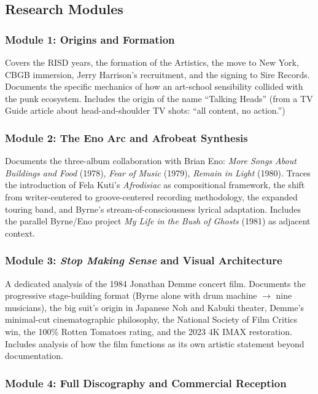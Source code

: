 \documentclass[11pt,letterpaper]{article}
\begin{document}
\subsection{Research Modules}

\subsubsection{Module 1: Origins and Formation}

Covers the RISD years, the formation of the Artistics, the move to New York, CBGB immersion, Jerry Harrison's recruitment, and the signing to Sire Records. Documents the specific mechanics of how an art-school sensibility collided with the punk ecosystem. Includes the origin of the name ``Talking Heads'' (from a TV Guide article about head-and-shoulder TV shots: ``all content, no action.'')

\subsubsection{Module 2: The Eno Arc and Afrobeat Synthesis}

Documents the three-album collaboration with Brian Eno: \textit{More Songs About Buildings and Food} (1978), \textit{Fear of Music} (1979), \textit{Remain in Light} (1980). Traces the introduction of Fela Kuti's \textit{Afrodisiac} as compositional framework, the shift from writer-centered to groove-centered recording methodology, the expanded touring band, and Byrne's stream-of-consciousness lyrical adaptation. Includes the parallel Byrne/Eno project \textit{My Life in the Bush of Ghosts} (1981) as adjacent context.

\subsubsection{Module 3: \textit{Stop Making Sense} and Visual Architecture}

A dedicated analysis of the 1984 Jonathan Demme concert film. Documents the progressive stage-building format (Byrne alone with drum machine $\to$ nine musicians), the big suit's origin in Japanese Noh and Kabuki theater, Demme's minimal-cut cinematographic philosophy, the National Society of Film Critics win, the 100\% Rotten Tomatoes rating, and the 2023 4K IMAX restoration. Includes analysis of how the film functions as its own artistic statement beyond documentation.

\subsubsection{Module 4: Full Discography and Commercial Reception}
\end{document}
